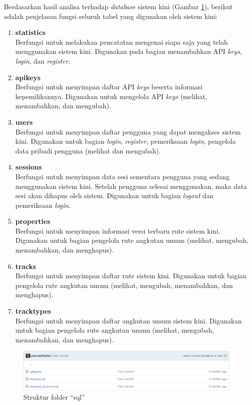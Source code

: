 Berdasarkan hasil analisa terhadap \textit{database} sistem kini (Gambar \ref{fig:4_struktursql}), berikut adalah penjelasan fungsi seluruh tabel yang digunakan oleh sistem kini:
\begin{enumerate}
	\item \textbf{statistics}\\
	Berfungsi untuk melakukan pencatatan mengenai siapa saja yang telah menggunakan sistem kini. Digunakan pada bagian menambahkan API \textit{keys}, \textit{login}, dan \textit{register}. 
	\item \textbf{apikeys}\\
	Berfungsi untuk menyimpan daftar API \textit{keys} beserta informasi kepemilikannya. Digunakan untuk mengelola API \textit{keys} (melihat, menambahkan, dan mengubah). 
	\item \textbf{users}\\
	Berfungsi untuk menyimpan daftar pengguna yang dapat mengakses sistem kini. Digunakan untuk bagian \textit{login}, \textit{register}, pemeriksaan \textit{login}, pengelola data pribadi pengguna (melihat dan mengubah). 
	\item \textbf{sessions}\\
	Berfungsi untuk menyimpan data sesi sementara pengguna yang sedang menggunakan sistem kini. Setelah pengguna selesai menggunakan, maka data sesi akan dihapus oleh sistem. Digunakan untuk bagian \textit{logout} dan pemeriksaan \textit{login}. 
	\item \textbf{properties}\\
	Berfungsi untuk menyimpan informasi versi terbaru rute sistem kini. Digunakan untuk bagian pengelola rute angkutan umum (melihat, mengubah, menambahkan, dan menghapus).
	\item \textbf{tracks}\\
	Berfungsi untuk menyimpan daftar rute sistem kini. Digunakan untuk bagian pengelola rute angkutan umum (melihat, mengubah, menambahkan, dan menghapus).
	\item \textbf{tracktypes}\\
	Berfungsi untuk menyimpan daftar angkutan umum sistem kini. Digunakan untuk bagian pengelola rute angkutan umum (melihat, mengubah, menambahkan, dan menghapus).
\end{enumerate}

\begin{figure}[htbp]
	\centering
		\includegraphics[scale=0.5]{Gambar/4_struktursql.png}
	\caption{Struktur folder ``sql''}
	\label{fig:4_struktursql}
\end{figure}

